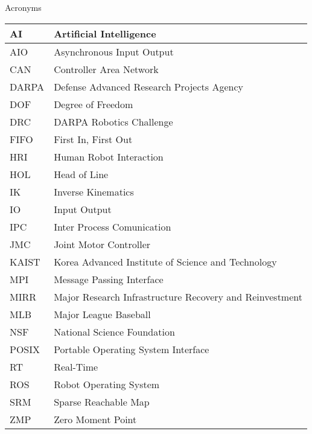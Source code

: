 \Large
\centering
Acronyms\\
\normalsize
\begin{tabular}{l | l}
\hline
AI & Artificial Intelligence\\
\hline
AIO & Asynchronous Input Output\\
\hline
CAN & Controller Area Network \\
\hline
DARPA  &  Defense Advanced Research Projects Agency\\
\hline 
DOF & Degree of Freedom \\
\hline
DRC  & DARPA Robotics Challenge \\
\hline
FIFO & First In, First Out\\
\hline
HRI & Human Robot Interaction\\
\hline
HOL & Head of Line\\
\hline
IK & Inverse Kinematics\\ 
\hline
IO & Input Output\\
\hline
IPC & Inter Process Comunication \\
\hline
JMC & Joint Motor Controller\\
\hline
KAIST & Korea Advanced Institute of Science and Technology \\
\hline
MPI & Message Passing Interface\\
\hline
MIRR & Major Research Infrastructure Recovery and Reinvestment\\
\hline
MLB & Major League Baseball\\
\hline
NSF & National Science Foundation \\
\hline
POSIX & Portable Operating System Interface\\
\hline
RT & Real-Time\\
\hline
ROS & Robot Operating System\\
\hline
SRM & Sparse Reachable Map \\
\hline 
ZMP & Zero Moment Point\\
\hline
\end{tabular}
